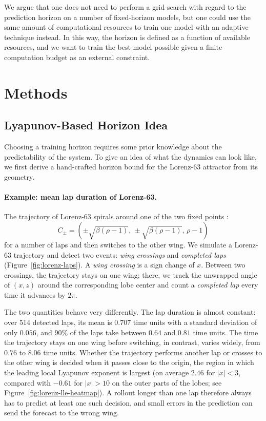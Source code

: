 \documentclass{article}
\begin{document}
We argue that one does not need to perform a grid search with regard to the prediction horizon on a number of fixed-horizon models, but one could use the same amount of computational resources to train one model with an adaptive technique instead. In this way, the horizon is defined as a function of available resources, and we want to train the best model possible given a finite computation budget as an external constraint.

\newpage

\section{Methods}

\subsection{Lyapunov-Based Horizon Idea}
\label{sec:lm-idea}

Choosing a training horizon requires some prior knowledge about the predictability of the system. To give an idea of what the dynamics can look like, we first derive a hand-crafted horizon bound for the Lorenz-63 attractor from its geometry.

\paragraph{Example: mean lap duration of Lorenz-63.}
The trajectory of Lorenz-63 spirals around one of the two fixed points \cite{strogatz_nonlinear_1994}:
\begin{equation}
    C_{\pm} = \left(\pm\sqrt{\beta(\rho-1)},\, \pm\sqrt{\beta(\rho-1)},\, \rho-1\right)
\end{equation}
for a number of laps and then switches to the other wing. We simulate a Lorenz-63 trajectory and detect two events: \emph{wing crossings} and \emph{completed laps} (Figure~\ref{fig:lorenz-laps}). A \emph{wing crossing} is a sign change of $x$. Between two crossings, the trajectory stays on one wing; there, we track the unwrapped angle of $(x, z)$ around the corresponding lobe center and count a \emph{completed lap} every time it advances by $2\pi$.

The two quantities behave very differently. The lap duration is almost constant: over 514 detected laps, its mean is $0.707$ time units with a standard deviation of only $0.056$, and 90\% of the laps take between $0.64$ and $0.81$ time units. The time the trajectory stays on one wing before switching, in contrast, varies widely, from $0.76$ to $8.06$ time units. Whether the trajectory performs another lap or crosses to the other wing is decided when it passes close to the origin, the region in which the leading local Lyapunov exponent is largest (on average $2.46$ for $|x| < 3$, compared with $-0.61$ for $|x| > 10$ on the outer parts of the lobes; see Figure~\ref{fig:lorenz-lle-heatmap}). A rollout longer than one lap therefore always has to predict at least one such decision, and small errors in the prediction can send the forecast to the wrong wing.
\end{document}

